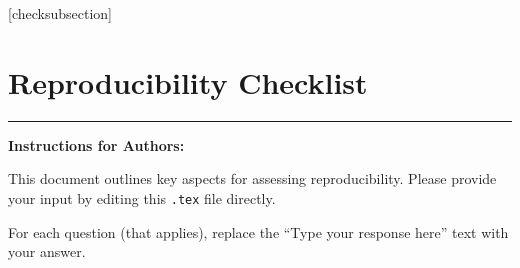 \documentclass[letterpaper]{article}
\begin{document}
\fi
\setlength{\leftmargini}{20pt}
\makeatletter\def\@listi{\leftmargin\leftmargini \topsep .5em \parsep .5em \itemsep .5em}
\def\@listii{\leftmargin\leftmarginii \labelwidth\leftmarginii \advance\labelwidth-\labelsep \topsep .4em \parsep .4em \itemsep .4em}
\def\@listiii{\leftmargin\leftmarginiii \labelwidth\leftmarginiii \advance\labelwidth-\labelsep \topsep .4em \parsep .4em \itemsep .4em}\makeatother

\setcounter{secnumdepth}{0}
\renewcommand\thesubsection{\arabic{subsection}}
\renewcommand\labelenumi{\thesubsection.\arabic{enumi}}

[checksubsection]

\newcommand{\checksubsection}[1]{%
  \refstepcounter{checksubsection}%
  \paragraph{\arabic{checksubsection}. #1}%
  \setcounter{checkitem}{0}%
}

\newcommand{\checkitem}{%
  \refstepcounter{checkitem}%
  \item[\arabic{checksubsection}.\arabic{checkitem}.]%
}
\newcommand{\question}[2]{\normalcolor\checkitem #1 #2 \color{blue}}
\newcommand{\ifyespoints}[1]{\makebox[0pt][l]{\hspace{-15pt}\normalcolor #1}}

\section*{Reproducibility Checklist}

\vspace{1em}
\hrule
\vspace{1em}

\textbf{Instructions for Authors:}

This document outlines key aspects for assessing reproducibility. Please provide your input by editing this \texttt{.tex} file directly.

For each question (that applies), replace the ``Type your response here'' text with your answer.
\end{document}
